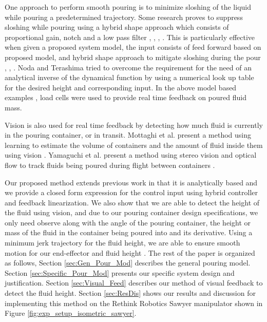 One approach to perform smooth pouring is to minimize sloshing of the liquid while pouring a predetermined trajectory. Some research proves to suppress sloshing while pouring using a hybrid shape approach which consists of proportional gain, notch and a low pass filter \cite{yano2001sloshing}, \cite{kaneko2003supervisory}, \cite{noda2005control}, \cite{sugimoto2002liquid}. This is particularly effective when given a proposed system model, the input consists of feed forward based on proposed model, and hybrid shape approach to mitigate sloshing during the pour \cite{noda2005control}, \cite{sugimoto2002liquid}, \cite{tsuji2014high}. Noda and Terashima tried to overcome the requirement for the need of an analytical inverse of the dynamical function by using a numerical look up table for the desired height \cite{noda2007falling} and corresponding input. In the above model based examples \cite{tsuji2014high}, \cite{noda2007falling} load cells were used to provide real time feedback on poured fluid mass. 

Vision is also used for real time feedback by detecting how much fluid is currently in the pouring container, or in transit. Mottaghi et al. present a method using learning to estimate the volume of containers and the amount of fluid inside them using vision \cite{mottaghi2017see}. Yamaguchi et al. present a method using stereo vision and optical flow to track fluids being poured during flight between containers \cite{yamaguchi2016stereo}.  

Our proposed method extends previous work in that it is analytically based and we provide a closed form expression for the control input using hybrid controller and feedback linearization. We also show that we are able to detect the height of the fluid using vision, and due to our pouring container design specifications, we only need observe along with the angle of the pouring container, the height or mass of the fluid in the container being poured into and its derivative. Using a minimum jerk trajectory for the fluid height, we are able to ensure smooth motion for our end-effector and fluid height \cite{zefran1998generation}. The rest of the paper is organized as follows, Section \ref{sec:Gen_Pour_Mod} describes the general pouring model. Section \ref{sec:Specific_Pour_Mod} presents our specific system design and justification. Section \ref{sec:Visual_Feed} describes our method of visual feedback to detect the fluid height. Section \ref{sec:ResDis} shows our results and discussion for implementing this method on the Rethink Robotics Sawyer manipulator shown in Figure \ref{fig:exp_setup_isometric_sawyer}. 

